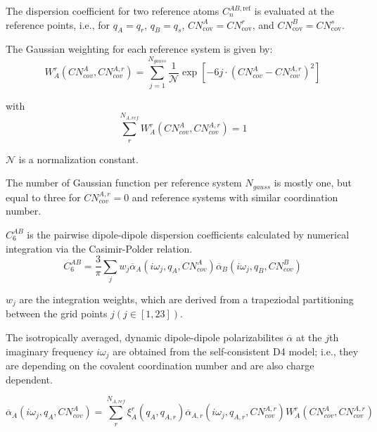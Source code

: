 The dispersion coefficient for two reference atoms \(C_n^{AB,\text{ref}}\) is evaluated at the reference points, i.e., for \(q_A = q_r\), \(q_B = q_s\), \(CN_{\text{cov}}^A = CN_{\text{cov}}^r\), and \(CN_{\text{cov}}^B = CN_{\text{cov}}^s\).

\vspace{10pt}
\noindent
The Gaussian weighting for each reference system is given by:
\begin{equation}
  W_A^r(CN_{cov}^A, CN_{cov}^{A,r}) = \sum_{j=1}^{N_{gauss}} \frac{1}{\mathcal{N}} \exp\left[-6j \cdot (CN_{cov}^A - CN_{cov}^{A,r})^2\right]
\end{equation}

with
\begin{equation}
  \sum_{r}^{N_{A,ref}} W_A^r(CN_{cov}^A, CN_{cov}^{A,r}) = 1
\end{equation}

\vspace{10pt}
\noindent
\(\mathcal{N}\) is a normalization constant.

\noindent
The number of Gaussian function per reference system \(N_{gauss}\) is mostly one, but equal to three for \(CN_{cov}^{A,r} = 0\) and reference systems with similar coordination number.


\vspace{10pt}
\noindent
\(C_6^{AB}\) is the pairwise dipole-dipole dispersion coefficients calculated by numerical integration via the Casimir-Polder relation.
\begin{equation}
  C_6^{AB} = \frac{3}{\pi} \sum_{j} w_j \overline{\alpha}_A (i\omega_j, q_A, CN_{cov}^A)\overline{\alpha}_B (i\omega_j, q_B, CN_{cov}^B)
\end{equation}

\noindent
\(w_j\) are the integration weights, which are derived from a trapeziodal partitioning between the grid points \(j(j \in [1,23])\).

\noindent
The isotropically averaged, dynamic dipole-dipole polarizabilites \(\overline{\alpha}\) at the \(j\)th imaginary frequency \(i\omega_j\) are obtained from the self-consistent D4 model; i.e., they are depending on the covalent coordination number and are also charge dependent.

\begin{equation}
  \overline{\alpha}_A(i\omega_j, q_A, CN_{cov}^A) = \sum_{r}^{N_{A,ref}} \xi_A^r (q_A, q_{A,r}) \overline{\alpha}_{A,r}(i\omega_j, q_{A,r}, CN_{cov}^{A,r}) W_A^r(CN_{cov}^A, CN_{cov}^{A,r})
\end{equation}


